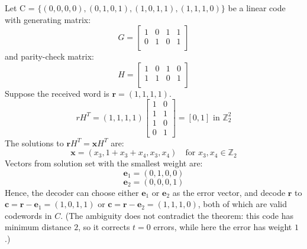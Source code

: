 \documentclass[docmute]{article}
\begin{document}
\begin{example}
Let C = $\{(0,0,0,0), (0,1,0,1), (1,0,1,1), (1,1,1,0)\}$ be a linear code with generating matrix:
$$ G = 
\begin{bmatrix}
  1 & 0 & 1 & 1 \\
  0 & 1 & 0 & 1 \\
\end{bmatrix} $$
and parity-check matrix:
$$ H =
\begin{bmatrix}
  1 & 0 & 1 & 0 \\
  1 & 1 & 0 & 1 \\
\end{bmatrix} $$
Suppose the received word is $\mathbf{r} = (1,1,1,1)$.
$$rH^T = (1,1,1,1) \begin{bmatrix} 1 & 0 \\ 1 & 1 \\ 1 & 0 \\ 0 & 1 \end{bmatrix} = [0, 1] \text{ in $\mathbb{Z}_2^2$}$$
The solutions to $\mathbf{r}H^T = \mathbf{x}H^T$ are:
$$\mathbf{x} = (x_3, 1 + x_3 + x_4, x_3, x_4) \quad \text{for } x_3, x_4 \in \mathbb{Z}_2$$
Vectors from solution set with the smallest weight are:
$$\mathbf{e}_1 = (0, 1, 0, 0)$$
$$\mathbf{e}_2 = (0, 0, 0, 1)$$
Hence, the decoder can choose either $\mathbf{e}_1$ or $\mathbf{e}_2$ as the error vector, and decode $\mathbf{r}$ to $\mathbf{c} = \mathbf{r} - \mathbf{e}_1 = (1,0,1,1)$ or $\mathbf{c} = \mathbf{r} - \mathbf{e}_2 = (1,1,1,0)$, both of which are valid codewords in $C$. (The ambiguity does not contradict the theorem: this code has minimum distance $2$, so it corrects $t=0$ errors, while here the error has weight $1$.)
\end{example}
\end{document}
